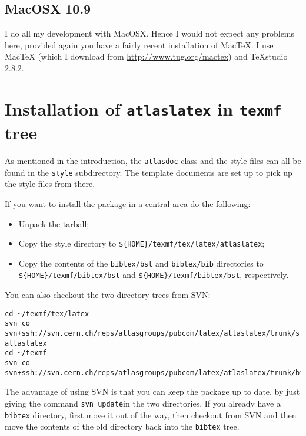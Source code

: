 \documentclass[koma,UKenglish]{style/atlasdoc}
\newcommand{\File}[1]{\texttt{#1}\xspace}
\newcommand{\Package}[1]{\texttt{#1}\xspace}
\begin{document}
\subsection{MacOSX 10.9}

I do all my development with MacOSX.
Hence I would not expect any problems here, provided again you have a fairly recent
installation of Mac\TeX.
I use	MacTeX (which I download from \url{http://www.tug.org/mactex}) and TeXstudio 2.8.2.


\section{Installation of \Package{atlaslatex} in \File{texmf} tree}
\label{sec:texmf}

As mentioned in the introduction, the \texttt{atlasdoc} class and the style files can all be found in the 
\File{style} subdirectory. The template documents are set up to pick up the style files from there.

If you want to install the package in a central area do the following:
\begin{itemize}
\item Unpack the tarball;
\item Copy the style directory to \File{\$\{HOME\}/texmf/tex/latex/atlaslatex};
\item Copy the contents of the \File{bibtex/bst} and \File{bibtex/bib} directories 
	to \texttt{\$\{HOME\}/texmf/bibtex/bst} and \texttt{\$\{HOME\}/texmf/bibtex/bst}, respectively.
\end{itemize}
You can also checkout the two directory trees from SVN:
\begin{verbatim}
cd ~/texmf/tex/latex
svn co svn+ssh://svn.cern.ch/reps/atlasgroups/pubcom/latex/atlaslatex/trunk/style atlaslatex
cd ~/texmf
svn co svn+ssh://svn.cern.ch/reps/atlasgroups/pubcom/latex/atlaslatex/trunk/bibtex
\end{verbatim}
The advantage of using SVN is that you can keep the package up to date, by just giving the command
\verb|svn update|in the two directories.
If you already have a \File{bibtex} directory, 
first move it out of the way, then checkout from SVN
and then move the contents of the old directory back into the \File{bibtex} tree.
\end{document}
